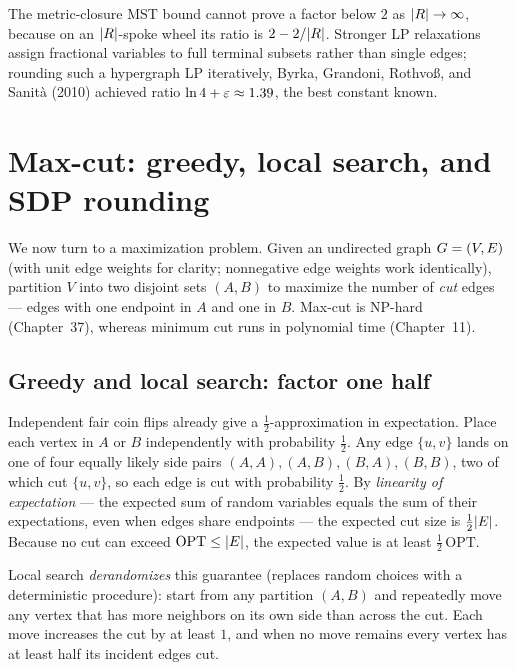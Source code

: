 \begin{connectionbox}
The metric-closure MST bound cannot prove a factor below $2$ as $\lvert R\rvert\to\infty$, because on an
$\lvert R\rvert$-spoke wheel its ratio is $2 - 2/\lvert R\rvert$. Stronger LP relaxations assign fractional variables
to full terminal subsets rather than single edges; rounding such a hypergraph LP iteratively, Byrka,
Grandoni, Rothvo\ss, and Sanit\`a (2010) achieved ratio $\ln 4 + \varepsilon \approx 1.39$, the best constant known.
\end{connectionbox}

\section{Max-cut: greedy, local search, and SDP rounding}

We now turn to a maximization problem. Given an undirected graph $G=(V,E)$ (with unit edge weights
for clarity; nonnegative edge weights work identically), partition $V$ into two disjoint sets $(A,B)$
to maximize the number of \emph{cut} edges --- edges with one endpoint in $A$ and one in $B$. Max-cut is
\textsf{NP}-hard (Chapter~37), whereas minimum cut runs in polynomial time (Chapter~11).

\subsection{Greedy and local search: factor one half}

\begin{intuitionbox}
Independent fair coin flips already give a $\tfrac12$-approximation in expectation. Place each vertex in
$A$ or $B$ independently with probability $\tfrac12$. Any edge $\{u,v\}$ lands on one of four equally
likely side pairs $(A,A),(A,B),(B,A),(B,B)$, two of which cut $\{u,v\}$, so each edge is cut with
probability $\tfrac12$. By \emph{linearity of expectation} --- the expected sum of random variables
equals the sum of their expectations, even when edges share endpoints --- the expected cut size is
$\tfrac12\lvert E\rvert$. Because no cut can exceed $\mathrm{OPT}\le\lvert E\rvert$, the expected value is at least
$\tfrac12\,\mathrm{OPT}$.

Local search \emph{derandomizes} this guarantee (replaces random choices with a deterministic procedure):
start from any partition $(A,B)$ and repeatedly move any vertex that has more neighbors on its own side
than across the cut. Each move increases the cut by at least $1$, and when no move remains every vertex
has at least half its incident edges cut.
\end{intuitionbox}

